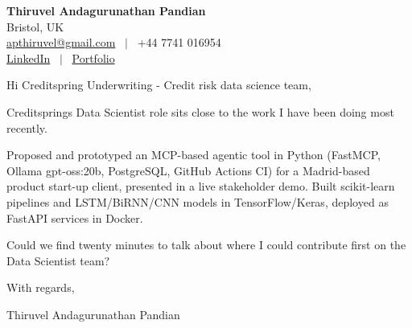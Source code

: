 \documentclass[11pt,a4paper]{article}
\begin{document}
\raggedright
\pagestyle{empty}

\begin{center}
    {\LARGE \color{linkblue} \textbf{Thiruvel Andagurunathan Pandian}}\\[0.2cm]
    Bristol, UK \\
    \href{mailto:apthiruvel@gmail.com}{apthiruvel@gmail.com} \ $|$ \ +44 7741 016954 \\
\href{https://www.linkedin.com/in/thiruvel-a-p/}{LinkedIn} \ $|$ \ \href{https://thiruvel-ap.github.io/PersonalPortfolio/}{Portfolio}
\end{center}

\vspace{0.4cm}

\noindent
Hi Creditspring Underwriting - Credit risk data science team,

Creditspring\textquotesingle{}s Data Scientist role sits close to the work I have been doing most recently.

Proposed and prototyped an MCP-based agentic tool in Python (FastMCP, Ollama gpt-oss:20b, PostgreSQL, GitHub Actions CI) for a Madrid-based product start-up client, presented in a live stakeholder demo. Built scikit-learn pipelines and LSTM/BiRNN/CNN models in TensorFlow/Keras, deployed as FastAPI services in Docker.

Could we find twenty minutes to talk about where I could contribute first on the Data Scientist team?

\vspace{0.5cm}

With regards,

Thiruvel Andagurunathan Pandian
\end{document}
